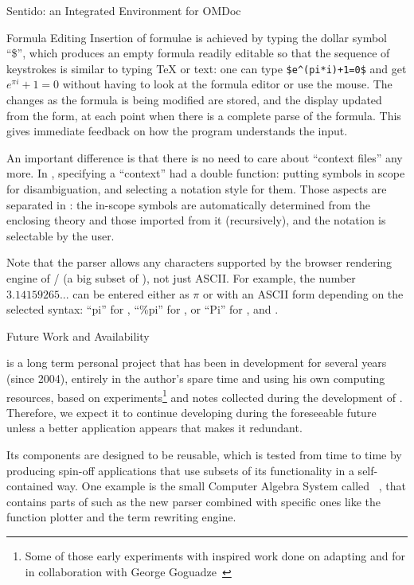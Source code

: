 \begin{omgroup}[id=sentido,short=Sentido Integrated Environment,
            creators=alberto]{Sentido: an Integrated Environment for OMDoc}
\begin{omgroup}{Formula Editing}
Insertion of formulae is achieved by typing the dollar symbol ``\$'',
which produces an empty formula readily editable so that the sequence
of keystrokes is similar to typing {\TeX} or {\qmath} text:
one can type {\verb|$e^(pi*i)+1=0$|} and get $e^{\pi i}+1=0$
without having to look at the formula editor or use the mouse.
The changes as the formula is being modified are stored,
and the display updated from the {\openmath} form,
at each point when there is a complete parse of the formula.
This gives immediate feedback on how the program understands the input.

An important difference is that there is no need to care about ``context files'' any more.
In {\qmath}, specifying a ``context'' had a double function: putting
symbols in scope for disambiguation, and selecting a notation style for them.
Those aspects are separated in {\sentido}:
the in-scope symbols are automatically determined from
the enclosing theory and those imported from it (recursively),
and the notation is selectable by the user.

Note that the parser allows any characters supported by the browser
rendering engine of {\mozilla}/{\firefox} (a big subset of {\unicode}),
not just ASCII. For example, the number $3.14159265...$ can be entered either
as $\pi$ or with an ASCII form depending on the selected syntax:
``pi'' for {\qmath}, ``\%pi'' for {\maxima},
or ``Pi'' for {\yacas}, {\maple} and {\mathematica}.
\end{omgroup}

\begin{omgroup}{Future Work and Availability}

{\sentido} is a long term personal project
that has been in development for several years (since 2004),
entirely in the author's spare time and using his own computing resources,
based on experiments\footnote{Some of those early experiments with {\mozilla}
inspired work done on adapting {\openoffice} and {\texmacs} for {\omdoc}
in collaboration with George Goguadze~\cite{GogPal:amesam03}}
and notes collected during the development of {\qmath}.
Therefore, we expect it to continue developing during the foreseeable future
unless a better application appears that makes it redundant.

Its components are designed to be reusable, which is tested from time to time by producing
spin-off applications that use subsets of its functionality in a self-contained way. One
example is the small Computer Algebra System called {\algebra}~\cite{algebra:URL}, that
contains parts of {\sentido} such as the new parser combined with specific ones like the
function plotter and the term rewriting engine.


\end{omgroup}
\end{omgroup}
